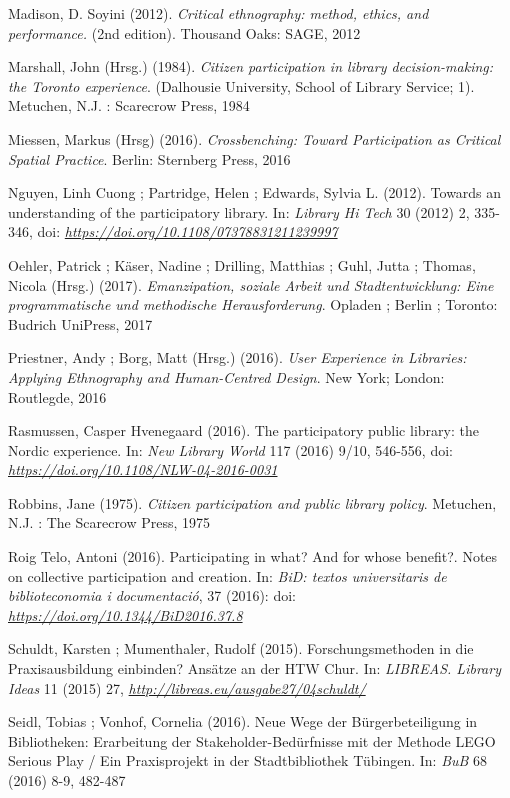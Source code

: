 \documentclass[a4paper,
fontsize=11pt,
oneside,
numbers=noperiodatend,
parskip=half-,
bibliography=totoc,
final
]{scrartcl}
\begin{document}
Madison, D. Soyini (2012). \emph{Critical ethnography: method, ethics,
and performance.} (2nd edition). Thousand Oaks: SAGE, 2012

Marshall, John (Hrsg.) (1984). \emph{Citizen participation in library
decision-making: the Toronto experience}. (Dalhousie University, School
of Library Service; 1). Metuchen, N.J. : Scarecrow Press, 1984

Miessen, Markus (Hrsg) (2016). \emph{Crossbenching: Toward Participation
as Critical Spatial Practice}. Berlin: Sternberg Press, 2016

Nguyen, Linh Cuong ; Partridge, Helen ; Edwards, Sylvia L. (2012).
Towards an understanding of the participatory library. In: \emph{Library
Hi Tech} 30 (2012) 2, 335-346, doi:
\href{https://doi.org/10.1108/07378831211239997}{\emph{https://doi.org/10.1108/07378831211239997}}

Oehler, Patrick ; Käser, Nadine ; Drilling, Matthias ; Guhl, Jutta ;
Thomas, Nicola (Hrsg.) (2017). \emph{Emanzipation, soziale Arbeit und
Stadtentwicklung: Eine programmatische und methodische Herausforderung}.
Opladen ; Berlin ; Toronto: Budrich UniPress, 2017

Priestner, Andy ; Borg, Matt (Hrsg.) (2016). \emph{User Experience in
Libraries: Applying Ethnography and Human-Centred Design}. New York;
London: Routlegde, 2016

Rasmussen, Casper Hvenegaard (2016). The participatory public library:
the Nordic experience. In: \emph{New Library World} 117 (2016) 9/10,
546-556, doi:
\href{https://doi.org/10.1108/NLW-04-2016-0031}{\emph{https://doi.org/10.1108/NLW-04-2016-0031}}

Robbins, Jane (1975). \emph{Citizen participation and public library
policy}. Metuchen, N.J. : The Scarecrow Press, 1975

Roig Telo, Antoni (2016). Participating in what? And for whose benefit?.
Notes on collective participation and creation. In: \emph{BiD: textos
universitaris de biblioteconomia i documentació}, 37 (2016): doi:
\href{http://dx.doi.org/10.1344/BiD2016.37.8}{\emph{https://doi.org/10.1344/BiD2016.37.8}}

Schuldt, Karsten ; Mumenthaler, Rudolf (2015). Forschungsmethoden in die
Praxisausbildung einbinden? Ansätze an der HTW Chur. In: \emph{LIBREAS.
Library Ideas} 11 (2015) 27,
\href{http://libreas.eu/ausgabe27/04schuldt/}{\emph{http://libreas.eu/ausgabe27/04schuldt/}}

Seidl, Tobias ; Vonhof, Cornelia (2016). Neue Wege der Bürgerbeteiligung
in Bibliotheken: Erarbeitung der Stakeholder-Bedürfnisse mit der Methode
LEGO Serious Play / Ein Praxisprojekt in der Stadtbibliothek Tübingen.
In: \emph{BuB} 68 (2016) 8-9, 482-487
\end{document}
